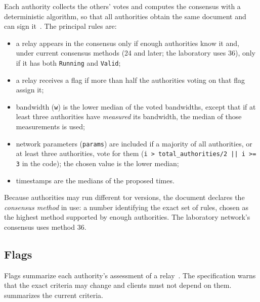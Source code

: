 Each authority collects the others' votes and computes the consensus with a deterministic algorithm, so that all authorities obtain the same document and can sign it~. The principal rules are:
\begin{itemize}
  \item a relay appears in the consensus only if enough authorities know it and, under current consensus methods (24 and later; the laboratory uses 36), only if it has both \texttt{Running} and \texttt{Valid};
  \item a relay receives a flag if more than half the authorities voting on that flag assign it;
  \item bandwidth (\texttt{w}) is the lower median of the voted bandwidths, except that if at least three authorities have \emph{measured} its bandwidth, the median of those measurements is used;
  \item network parameters (\texttt{params}) are included if a majority of all authorities, or at least three authorities, vote for them (\texttt{i > total\_authorities/2 || i >= 3} in the code); the chosen value is the lower median;
  \item timestamps are the medians of the proposed times.
\end{itemize}
Because authorities may run different tor versions, the document declares the \emph{consensus method} in use: a number identifying the exact set of rules, chosen as the highest method supported by enough authorities. The laboratory network's consensus uses method 36.

\subsection{Flags}\label{sec:dir-flag}

Flags summarize each authority's assessment of a relay~. The specification warns that the exact criteria may change and clients must not depend on them.  summarizes the current criteria.


